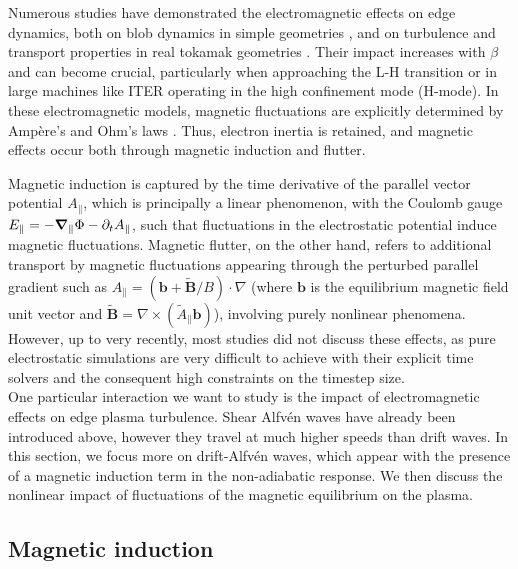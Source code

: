 Numerous studies have demonstrated the electromagnetic effects on edge dynamics, both on blob dynamics in simple geometries \cite{lee2015, Stepanenko_2020}, and on turbulence and transport properties in real tokamak geometries \cite{zhu2023, zholobenko_2024}. Their impact increases with $\beta$ and can become crucial, particularly when approaching the L-H transition or in large machines like ITER operating in the high confinement mode (H-mode)\cite{zholobenko_2024}. In these electromagnetic models, magnetic fluctuations are explicitly determined by Ampère's and Ohm’s laws \cite{DUDSON_2009, Ricci_2012, dudson2015, stegmeir2019, giacomin2022gbs, zhang2024}. Thus, electron inertia is retained, and magnetic effects occur both through magnetic induction and flutter. 

Magnetic induction is captured by the time derivative of the parallel vector potential $A_\parallel$, which is principally a linear phenomenon, with the Coulomb gauge $E_\parallel = - \grad_\parallel \Phi - \partial_t A_\parallel$, such that fluctuations in the electrostatic potential induce magnetic fluctuations. Magnetic flutter\cite{callen_1977}, on the other hand, refers to additional transport by magnetic fluctuations appearing through the perturbed parallel gradient such as $A_\parallel = (\boldsymbol{b} + \boldsymbol{\tilde{B}}/B) \cdot \nabla$ (where $\boldsymbol{b}$ is the equilibrium magnetic field unit vector and $\boldsymbol{\tilde{B}} = \nabla \times (\tilde{A}_\parallel \boldsymbol{b})$), involving purely nonlinear phenomena. However, up to very recently, most studies did not discuss these effects, as pure electrostatic simulations are very difficult to achieve with their explicit time solvers \cite{stegmeir2019, giacomin2022gbs} and the consequent high constraints on the timestep size. \\


One particular interaction we want to study is the impact of electromagnetic effects on edge plasma turbulence. Shear Alfvén waves have already been introduced above, however they travel at much higher speeds than drift waves. In this section, we focus more on drift-Alfvén waves, which appear with the presence of a magnetic induction term in the non-adiabatic response. We then discuss the nonlinear impact of fluctuations of the magnetic equilibrium on the plasma.


\subsection{Magnetic induction}

